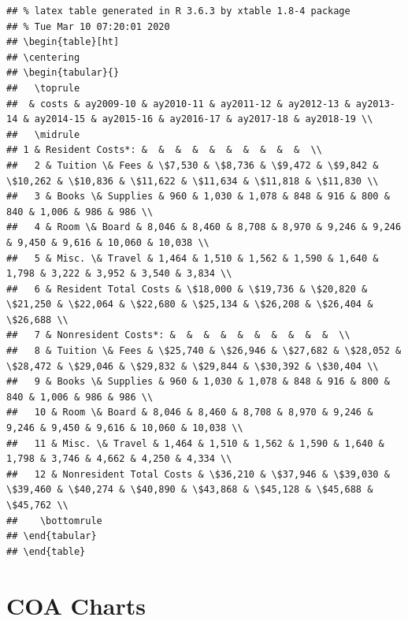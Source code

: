 \documentclass[
]{book}
\begin{document}
\begin{verbatim}
## % latex table generated in R 3.6.3 by xtable 1.8-4 package
## % Tue Mar 10 07:20:01 2020
## \begin{table}[ht]
## \centering
## \begin{tabular}{}
##   \toprule
##  & costs & ay2009-10 & ay2010-11 & ay2011-12 & ay2012-13 & ay2013-14 & ay2014-15 & ay2015-16 & ay2016-17 & ay2017-18 & ay2018-19 \\ 
##   \midrule
## 1 & Resident Costs*: &  &  &  &  &  &  &  &  &  &  \\ 
##   2 & Tuition \& Fees & \$7,530 & \$8,736 & \$9,472 & \$9,842 & \$10,262 & \$10,836 & \$11,622 & \$11,634 & \$11,818 & \$11,830 \\ 
##   3 & Books \& Supplies & 960 & 1,030 & 1,078 & 848 & 916 & 800 & 840 & 1,006 & 986 & 986 \\ 
##   4 & Room \& Board & 8,046 & 8,460 & 8,708 & 8,970 & 9,246 & 9,246 & 9,450 & 9,616 & 10,060 & 10,038 \\ 
##   5 & Misc. \& Travel & 1,464 & 1,510 & 1,562 & 1,590 & 1,640 & 1,798 & 3,222 & 3,952 & 3,540 & 3,834 \\ 
##   6 & Resident Total Costs & \$18,000 & \$19,736 & \$20,820 & \$21,250 & \$22,064 & \$22,680 & \$25,134 & \$26,208 & \$26,404 & \$26,688 \\ 
##   7 & Nonresident Costs*: &  &  &  &  &  &  &  &  &  &  \\ 
##   8 & Tuition \& Fees & \$25,740 & \$26,946 & \$27,682 & \$28,052 & \$28,472 & \$29,046 & \$29,832 & \$29,844 & \$30,392 & \$30,404 \\ 
##   9 & Books \& Supplies & 960 & 1,030 & 1,078 & 848 & 916 & 800 & 840 & 1,006 & 986 & 986 \\ 
##   10 & Room \& Board & 8,046 & 8,460 & 8,708 & 8,970 & 9,246 & 9,246 & 9,450 & 9,616 & 10,060 & 10,038 \\ 
##   11 & Misc. \& Travel & 1,464 & 1,510 & 1,562 & 1,590 & 1,640 & 1,798 & 3,746 & 4,662 & 4,250 & 4,334 \\ 
##   12 & Nonresident Total Costs & \$36,210 & \$37,946 & \$39,030 & \$39,460 & \$40,274 & \$40,890 & \$43,868 & \$45,128 & \$45,688 & \$45,762 \\ 
##    \bottomrule
## \end{tabular}
## \end{table}
\end{verbatim}

\hypertarget{coa-charts}{%
\section{COA Charts}\label{coa-charts}}
\end{document}
